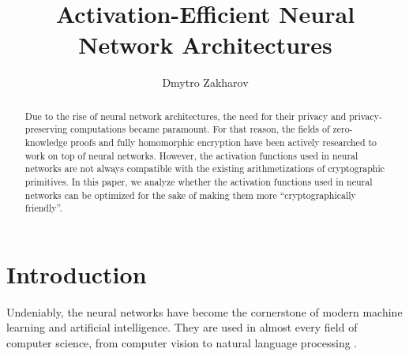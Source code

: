 \documentclass{iacrtrans}
\author{Dmytro Zakharov\inst{1}}
\institute{V.N. Karazin Kharkiv National University \email{zakharov2025mp11@student.karazin.ua}}
\title[Activation-Efficient Neural Networks]{Activation-Efficient Neural Network Architectures}
\begin{document}
\maketitle


\begin{abstract}
    Due to the rise of neural network architectures, the need for their privacy
    and privacy-preserving computations became paramount. For that reason, the 
    fields of zero-knowledge proofs and fully homomorphic encryption have been
    actively researched to work on top of neural networks. However, the 
    activation functions used in neural networks are not always compatible with
    the existing arithmetizations of cryptographic primitives. In this paper, we
    analyze whether the activation functions used in neural networks can be
    optimized for the sake of making them more ``cryptographically friendly''.
\end{abstract}

\tableofcontents{}

\section{Introduction}

Undeniably, the neural networks have become the cornerstone of modern machine
learning and artificial intelligence. They are used in almost every field of
computer science, from computer vision \cite{nns-in-cv-1,nns-in-cv-2} to natural
language processing \cite{nns-in-nlps-1,nns-in-nlps-2}.
\end{document}
